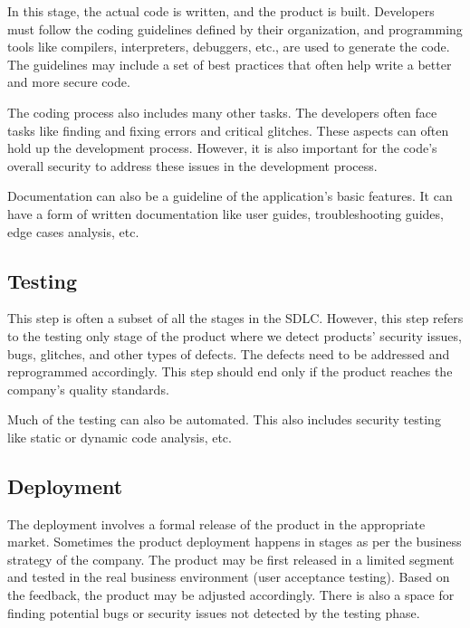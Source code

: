 \documentclass[12pt,a4,twoside]{article}
\begin{document}
In this stage, the actual code is written, and the product is built. Developers must follow the coding guidelines defined by their organization, and programming tools like compilers, interpreters, debuggers, etc., are used to generate the code. The guidelines may include a set of best practices that often help write a better and more secure code. \cite{sdlc_tutorials_point}

The coding process also includes many other tasks. The developers often face tasks like finding and fixing errors and critical glitches. These aspects can often hold up the development process. However, it is also important for the code's overall security to address these issues in the development process. \cite{sdlc_phoenix}

Documentation can also be a guideline of the application's basic features. It can have a form of written documentation like user guides, troubleshooting guides, edge cases analysis, etc. \cite{sdlc_phoenix}

\subsection{Testing}

This step is often a subset of all the stages in the SDLC. However, this step refers to the testing only stage of the product where we detect products' security issues, bugs, glitches, and other types of defects. The defects need to be addressed and reprogrammed accordingly. This step should end only if the product reaches the company's quality standards. \cite{sdlc_tutorials_point}

Much of the testing can also be automated. This also includes security testing like static or dynamic code analysis, etc. \cite{sdlc_phoenix}

\subsection{Deployment}

The deployment involves a formal release of the product in the appropriate market. Sometimes the product deployment happens in stages as per the business strategy of the company. The product may be first released in a limited segment and tested in the real business environment (user acceptance testing). Based on the feedback, the product may be adjusted accordingly. There is also a space for finding potential bugs or security issues not detected by the testing phase. \cite{sdlc_tutorials_point}
\end{document}

